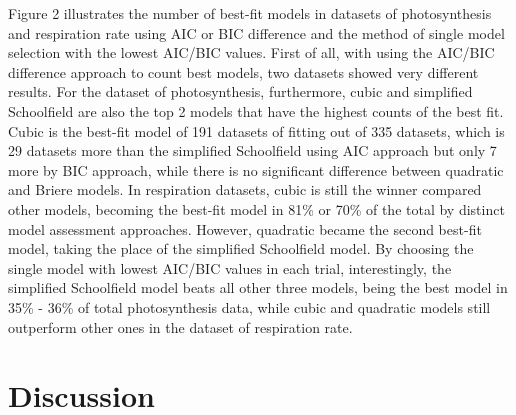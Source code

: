\documentclass[11pt]{article}
\begin{document}
Figure 2 illustrates the number of best-fit models in datasets of photosynthesis and respiration rate using AIC or BIC difference and the method of single model selection with the lowest AIC/BIC values. First of all, with using the AIC/BIC difference approach to count best models, two datasets showed very different results. For the dataset of photosynthesis, furthermore, cubic and simplified Schoolfield are also the top 2 models that have the highest counts of the best fit. Cubic is the best-fit model of 191 datasets of fitting out of 335 datasets, which is 29 datasets more than the simplified Schoolfield using AIC approach but only 7 more by BIC approach, while there is no significant difference between quadratic and Briere models. In respiration datasets, cubic is still the winner compared other models, becoming the best-fit model in 81\% or 70\% of the total by distinct model assessment approaches. However, quadratic became the second best-fit model, taking the place of the simplified Schoolfield model. By choosing the single model with lowest AIC/BIC values in each trial, interestingly, the simplified Schoolfield model beats all other three models, being the best model in 35\% - 36\% of total photosynthesis data, while cubic and quadratic models still outperform other ones in the dataset of respiration rate.

\section{Discussion}
\end{document}
